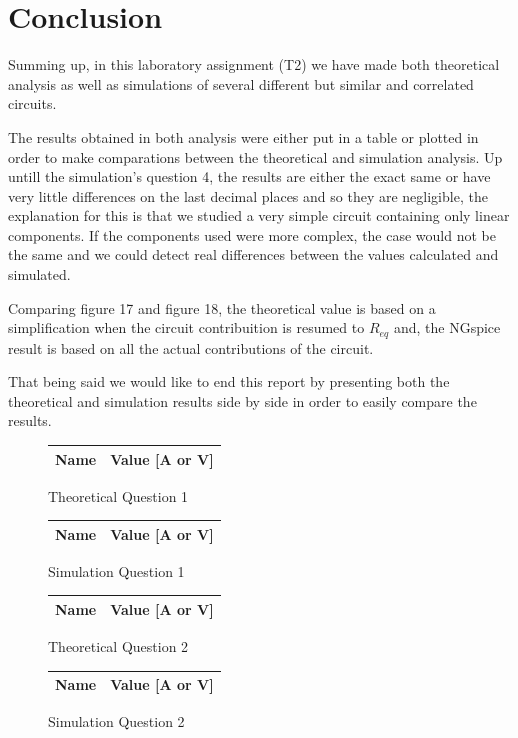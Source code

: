 \section{Conclusion}
\label{sec:conclusion}

Summing up, in this laboratory assignment (T2) we have made both theoretical analysis as well as simulations of several different but similar and correlated circuits. \par
The results obtained in both analysis were either put in a table or plotted in order to make comparations between the theoretical and simulation analysis.
Up untill the simulation's question 4, the results are either the exact same or have very little differences on the last decimal places and so they are negligible, the explanation for this is that we studied a very simple circuit containing only linear components. If the components used were more complex, the case would not be the same and we could detect real differences between the values calculated and simulated. \par
Comparing figure 17 and figure 18, the theoretical value is based on a simplification when the circuit contribuition is resumed to $R_{eq}$ and, the NGspice result is based on all the actual contributions of the circuit. \par
That being said we would like to end this report by presenting both the theoretical and simulation results side by side in order to easily compare the results.


\begin{figure}[H]
      \centering
      \begin{tabular}{ | c | c | }
      \hline    
      {\bf Name} & {\bf Value [A or V]} \\ \hline
      
      \hline
      \end{tabular}
      \caption{Theoretical Question 1}
    \endminipage\hfill
      \centering
      \begin{tabular}{ | c | c | }
      \hline    
      {\bf Name} & {\bf Value [A or V]} \\ \hline
      
      \end{tabular}
      \caption{Simulation Question 1}
    \endminipage\hfill
\end{figure}

\begin{figure}[H]
      \centering
      \begin{tabular}{ | c | c | }
      \hline    
      {\bf Name} & {\bf Value [A or V]} \\ \hline
      
      \hline
      \end{tabular}
      \caption{Theoretical Question 2}
    \endminipage\hfill
      \centering
      \begin{tabular}{ | c | c | }
      \hline    
      {\bf Name} & {\bf Value [A or V]} \\ \hline
      
      \end{tabular}
      \caption{Simulation Question 2}
    \endminipage\hfill
\end{figure}

